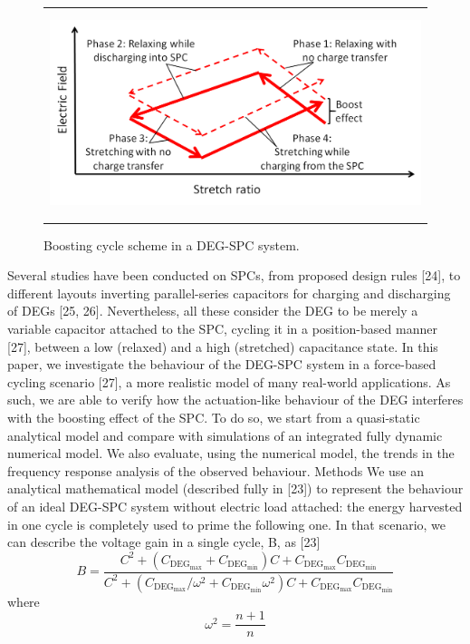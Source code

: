 \begin{figure}[ht]
\begin{center}
\begin{tabular}{c}
\includegraphics[height=6cm]{fig04/SPC_cycle_ph2.png}
\end{tabular}
\end{center}
\caption 
{ \label{fig:SPC_cycle}
Boosting cycle scheme in a DEG-SPC system.}
\end{figure}   


Several studies have been conducted on SPCs, from proposed design rules [24], to different layouts inverting parallel-series capacitors for charging and discharging of DEGs [25, 26]. Nevertheless, all these consider the DEG to be merely a variable capacitor attached to the SPC, cycling it in a position-based manner [27], between a low (relaxed) and a high (stretched) capacitance state.
In this paper, we investigate the behaviour of the DEG-SPC system in a force-based cycling scenario [27], a more realistic model of many real-world applications. As such, we are able to verify how the actuation-like behaviour of the DEG interferes with the boosting effect of the SPC. To do so, we start from a quasi-static analytical model and compare with simulations of an integrated fully dynamic numerical model. We also evaluate, using the numerical model, the trends in the frequency response analysis of the observed behaviour.
	Methods
We use an analytical mathematical model (described fully in [23]) to represent the behaviour of an ideal DEG-SPC system without electric load attached: the energy harvested in one cycle is completely used to prime the following one. In that scenario, we can describe the voltage gain in a single cycle, B, as [23]
\begin{equation}
B=\frac{C^2+(C_{\text{DEG}_\text{max}} + C_{\text{DEG}_\text{min}})C+C_{\text{DEG}_\text{max}}C_{\text{DEG}_\text{min}}}{C^2+(C_{\text{DEG}_\text{max}}/\omega^2 +C_{\text{DEG}_\text{min}}\omega^2)C+C_{\text{DEG}_\text{max}}C_{\text{DEG}_\text{min}}} 
\end{equation}
where 
\begin{equation}
\omega^2=  \frac{n+1}{n}
\end{equation}


